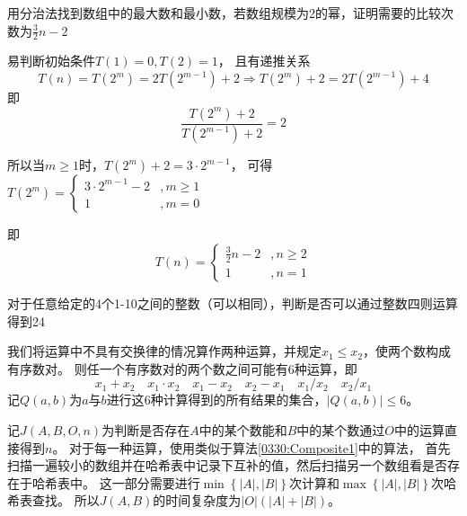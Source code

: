 \documentclass[answers]{exam}
\begin{document}
\begin{questions}
    \question 用分治法找到数组中的最大数和最小数，若数组规模为2的幂，证明需要的比较次数为$\frac{3}{2} n -2$
    \begin{solution}
        易判断初始条件$T(1) = 0, T(2) = 1$，
        且有递推关系
        \[ T(n) = T(2^m) = 2T(2^{m-1}) + 2 \Rightarrow T(2^m) + 2 = 2T(2^{m-1}) + 4 \]
        即
        \[ \frac{T(2^m) + 2}{T(2^{m-1}) + 2} = 2 \]

        所以当$m \ge 1$时，$T(2^m) + 2 = 3 \cdot 2^{m-1}$，
        可得$T(2^m) = \begin{cases}
                3 \cdot 2^{m-1} - 2 & , m \ge 1 \\
                1                   & , m = 0
            \end{cases}
        $

        即
        \[
            T(n) = \begin{cases}
                \frac{3}{2} n - 2 & , n \ge 2 \\
                1                 & , n = 1
            \end{cases}
        \]
    \end{solution}

    \question 对于任意给定的4个1-10之间的整数（可以相同），判断是否可以通过整数四则运算得到24
    \begin{solution}
        我们将运算中不具有交换律的情况算作两种运算，并规定$x_1 \leq x_2$，使两个数构成有序数对。
        则任一个有序数对的两个数之间可能有$6$种运算，即 \[
            x_1 + x_2 \quad x_1 \cdot x_2 \quad x_1 - x_2 \quad x_2 - x_1 \quad x_1 / x_2 \quad x_2 / x_1
        \]
        记$Q(a,b)$为$a$与$b$进行这$6$种计算得到的所有结果的集合，$|Q(a,b)| \le 6$。

        记$J(A,B,O,n)$为判断是否存在$A$中的某个数能和$B$中的某个数通过$O$中的运算直接得到$n$。
        对于每一种运算，使用类似于算法\ref{0330:Composite1}中的算法，
        首先扫描一遍较小的数组并在哈希表中记录下互补的值，然后扫描另一个数组看是否存在于哈希表中。
        这一部分需要进行$\min\left\{ |A|, |B| \right\}$次计算和$\max\left\{ |A|, |B| \right\}$次哈希表查找。
        所以$J(A,B)$的时间复杂度为$|O|(|A| + |B|)$。


\end{solution}
\end{questions}
\end{document}
